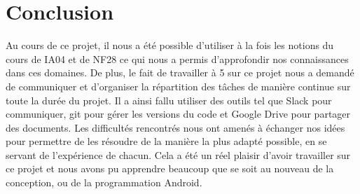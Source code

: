 \documentclass[a4paper,11pt]{article}
\begin{document}
\section{Conclusion}
Au cours de ce projet, il nous a été possible d'utiliser à la fois les notions du cours de IA04 et de NF28 ce qui nous a permis d'approfondir nos connaissances dans ces domaines.
De plus, le fait de travailler à 5 sur ce projet nous a demandé de communiquer et d'organiser la répartition des tâches de manière continue sur toute la durée du projet. Il a ainsi fallu utiliser des outils tel que Slack pour communiquer, git pour gérer les versions du code et Google Drive pour partager des documents.
Les difficultés rencontrés nous ont amenés à échanger nos idées pour permettre de les résoudre de la manière la plus adapté possible, en se servant de l'expérience de chacun. 
Cela a été un réel plaisir d'avoir travailler sur ce projet et nous avons pu apprendre beaucoup que se soit au nouveau de la conception, ou de la programmation Android.
\end{document}
